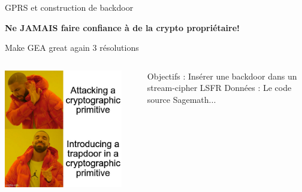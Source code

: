 \begin{frame}{GPRS et construction de backdoor}
    \large{\centerline{\textbf{Ne JAMAIS faire confiance à de la crypto propriétaire!}}}

\end{frame}


\begin{frame}{Make GEA great again \FiveStar\FiveStar\FiveStar \hfill 3 résolutions}
    \begin{columns}[c]
        \begin{center}                  
            \includegraphics[width=0.9\textwidth]{img/meme/gea-intro.png}
        \end{center}

           \begin{outline}
                \1 Objectifs : 
                    \2 Insérer une backdoor dans un stream-cipher LSFR
                \1 Données :
                    \2 Le code source
                    \2 Sagemath...
           \end{outline}
    \end{columns}
\end{frame}


